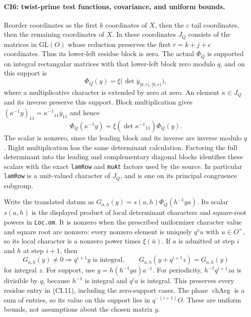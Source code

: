 \paragraph{CI6: twist-prime test functions, covariance, and uniform bounds.}
Reorder coordinates as the first $k$ coordinates of $X$, then
the $c$ tail coordinates, then the remaining coordinates of $X$.
In these coordinates $J_Q$ consists of the matrices in
$\mathrm{GL}(O)$ whose reduction preserves the first $r=k+j+c$
coordinates. Thus its lower-left residue block is zero.
The actual $\Phi_Q$ is supported on integral rectangular matrices
with that lower-left block zero modulo $q$, and on this support is
\[
 \Phi_Q(y)=\xi\bigl(\det\overline{y}_{[0,r),[0,r)}\bigr),
 \tag{CI.11}
\]
where a multiplicative character is extended by zero at zero.
An element $\kappa\in J_Q$ and its inverse preserve this support.
Block multiplication gives
$\overline{(\kappa^{-1}y)}_{11}
=\overline{\kappa^{-1}}_{11}\bar y_{11}$ and hence
\[
 \Phi_Q(\kappa^{-1}y)=
   \xi(\det\overline{\kappa^{-1}}_{11})\Phi_Q(y).
 \tag{CI.12}
\]
The scalar is nonzero, since the leading block and its inverse
are inverse modulo $q$. Right multiplication has the same
determinant calculation. Factoring the full determinant into
the leading and complementary diagonal blocks identifies these
scalars with the exact \texttt{lamRow} and \texttt{muAt} factors
used by the source. In particular \texttt{lamRow} is a unit-valued
character of $J_Q$, and is one on its principal congruence subgroup.

Write the translated datum as
$G_{a,h}(y)=s(a,h)\Phi_Q(h^{-1}ya)$. Its scalar $s(a,h)$ is the
displayed product of local determinant characters and square-root
powers in \texttt{Loc.om}. It is nonzero when the prescribed
uniformizer character value and square root are nonzero:
every nonzero element is uniquely $q^v u$ with $u\in O^\times$,
so its local character is a nonzero power times $\xi(\bar u)$.
If $a$ is admitted at step $i$ and $h$ at step $i+1$, then
\[
 G_{a,h}(y)\ne0\Longrightarrow q^{i+1}y\text{ is integral},
 \qquad G_{a,h}(y+q^{i+1}z)=G_{a,h}(y)
 \tag{CI.13}
\]
for integral $z$. For support, use $y=h(h^{-1}ya)a^{-1}$.
For periodicity, $h^{-1}q^{i+1}za$ is divisible by $q$, because
$h^{-1}$ is integral and $q^ia$ is integral. This preserves every
residue entry in (CI.11), including the zero-support cases.
The phase $\operatorname{chArg}$ is a sum of entries, so its value
on this support lies in $q^{-(i+1)}O$. These are uniform bounds,
not assumptions about the chosen matrix $y$.

